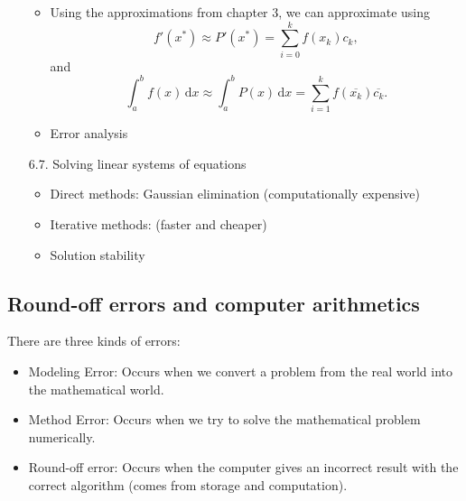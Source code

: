 \documentclass{article}
\begin{document}
\begin{enumerate}
    \begin{itemize}
      \item Using the approximations from chapter $3$, we can approximate using
      \[
        f'(x^*)\approx P'(x^*) = \sum_{i=0}^{k}f(x_k)c_k,
      \]
      and
      \[
        \int_{a}^{b}f(x) \,\mathrm dx\approx \int_{a}^{b}P(x) \,\mathrm dx = \sum_{i=1}^{k} f(\overline{x_k})\overline{c_k}.
      \]
      \item Error analysis
    \end{itemize}
    \item[6.7.] Solving linear systems of equations
    \begin{itemize}
      \item Direct methods: Gaussian elimination (computationally expensive)
      \item Iterative methods: (faster and cheaper)
      \item Solution stability
    \end{itemize}
  \end{enumerate}
  \subsection{Round-off errors and computer arithmetics}
  There are three kinds of errors:
  \begin{itemize}
    \item Modeling Error: Occurs when we convert a problem from the real world into the mathematical world.
    \item Method Error: Occurs when we try to solve the mathematical problem numerically.
    \item Round-off error: Occurs when the computer gives an incorrect result with the correct algorithm (comes from storage and computation).
  \end{itemize}
\end{document}
